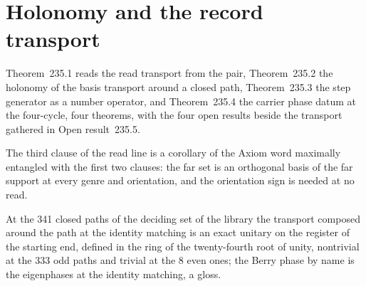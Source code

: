 \section{Holonomy and the record transport}\label{mod:XIII-6-holonomy-and-the-record-transport}
\label{narr:open:13-6}Theorem~235.1 reads the read transport from the pair, Theorem~235.2 the holonomy of the basis transport around a closed path, Theorem~235.3 the step generator as a number operator, and Theorem~235.4 the carrier phase datum at the four-cycle, four theorems, with the four open results beside the transport gathered in Open result~235.5.
\begin{chtheorem}\label{box:XIII-6-holonomy-and-the-record-transport:1}
The third clause of the read line is a corollary of the Axiom word maximally entangled with the first two clauses: the far set is an orthogonal basis of the far support at every genre and orientation, and the orientation sign is needed at no read.
\end{chtheorem}
\begin{chtheorem}\label{box:XIII-6-holonomy-and-the-record-transport:2}
At the 341 closed paths of the deciding set of the library the transport composed around the path at the identity matching is an exact unitary on the register of the starting end, defined in the ring of the twenty-fourth root of unity, nontrivial at the 333 odd paths and trivial at the 8 even ones; the Berry phase by name is the eigenphases at the identity matching, a gloss.
\end{chtheorem}
